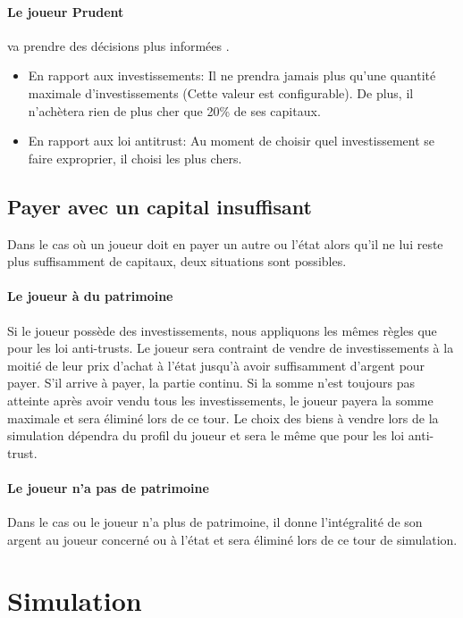 \documentclass[12pt]{article}
\begin{document}
  
   \paragraph {Le joueur Prudent}  va prendre des décisions plus informées . 
    \begin{itemize}
   	\item En rapport aux investissements: Il ne prendra jamais plus qu'une quantité maximale d'investissements (Cette valeur est configurable). De plus, il n'achètera rien de plus cher que 20\% de ses capitaux. 
	\item En rapport aux loi antitrust: Au moment de choisir quel investissement se faire exproprier, il choisi les plus chers.
   \end{itemize}
   
    \subsection{Payer avec un capital insuffisant}
    Dans le cas où un joueur doit en payer un autre ou l'état alors qu'il ne lui reste plus suffisamment de capitaux, 
    deux situations sont possibles.
    
    \paragraph {Le joueur à du patrimoine} 
   Si le joueur possède des investissements, nous appliquons les mêmes règles que pour les loi anti-trusts.
   Le joueur sera contraint de vendre de investissements à la moitié de leur prix d'achat à l'état jusqu'à avoir suffisamment d'argent pour payer. S'il arrive à payer, la partie continu. Si la somme n'est toujours pas atteinte après avoir vendu tous les investissements, le joueur payera la somme maximale et sera éliminé lors de ce tour.
   Le choix des biens à vendre lors de la simulation dépendra du profil du joueur et sera le même que pour les loi anti-trust.
    \paragraph {Le joueur n'a pas de patrimoine} 
	Dans le cas ou le joueur n'a plus de patrimoine, il donne l'intégralité de son argent au joueur concerné ou à l'état et sera éliminé lors de ce tour de simulation.

\section{Simulation}
\end{document}
